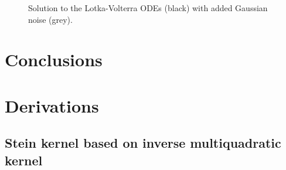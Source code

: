 \documentclass[11pt,a4paper]{report}
\begin{document}
\begin{figure}[h]
\centering
{}
\caption{Solution to the Lotka-Volterra ODEs (black) with added Gaussian noise (grey).
\label{fig:lotka-volterra:data}}
\end{figure}


\chapter{Conclusions}

\appendix
\chapter{Derivations}
\label{appendix:derivations}

\section{Stein kernel based on inverse multiquadratic kernel}
\label{appendix:derivations:imq-stein}
\end{document}

